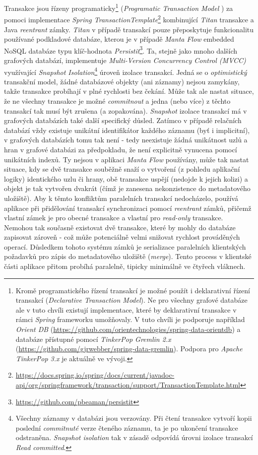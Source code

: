 Transakce jsou řízeny programaticky\footnote{Kromě programatického řízení transakcí je možné použít i deklarativní řízení transakcí (\textit{Declarative Transaction Model}). Ne pro všechny grafové databáze ale v tuto chvíli existují implementace, které by deklarativní transakce v rámci \textit{Spring} frameworku umožňovaly. V tuto chvíli je podporuje například \textit{Orient DB} (\url{https://github.com/orientechnologies/spring-data-orientdb}) a databáze přístupné pomocí \textit{TinkerPop Gremlin 2.x} (\url{https://github.com/gjrwebber/spring-data-gremlin}). Podpora pro \textit{Apache TinkerPop 3.x} je aktuálně ve vývoji.} (\textit{Programatic Transaction Model} \cite{Little04}) za pomoci implementace \textit{Spring TransactionTemplate}\footnote{\url{https://docs.spring.io/spring/docs/current/javadoc-api/org/springframework/transaction/support/TransactionTemplate.html}} kombinující \textit{Titan} transakce a Java \textit{reentrant} zámky.
\textit{Titan} v případě transakcí pouze přeposkytuje funkcionalitu používané podkladové databáze, kterou je v případě \textit{Manta Flow} embedded NoSQL databáze typu klíč-hodnota \textit{Persistit}\footnote{\url{https://github.com/pbeaman/persistit}}. Ta, stejně jako mnoho dalších grafových databází, implementuje \textit{Multi-Version Concurrency Control (MVCC)} \cite{Prakash10} využívající \textit{Snapshot Isolation}\footnote{Všechny záznamy v databázi jsou verzovány. Při čtení transakce vytvoří kopii poslední \textit{commitnuté} verze čteného záznamu, ta je po ukončení transakce odstraněna. \textit{Snapshot isolation} tak v zásadě odpovídá úrovni izolace transakcí \textit{Read committed}.} úroveň izolace transakcí.
Jedná se o \textit{optimistický} transakční model, žádné databázové objekty (ani záznamy) nejsou zamykány, takže transakce probíhají v plné rychlosti bez čekání. Může tak ale nastat situace, že ne všechny transakce je možné \textit{commitnout} a jedna (nebo více) z těchto transakcí tak musí být zrušena (a zopakována). \textit{Snapshot} izolace transakcí má v grafových databázích také další specifický důsled. Zatímco v případě relačních databází vždy existuje unikátní identifikátor každého záznamu (byť i implicitní), v grafových databázích tomu tak není - tedy neexistuje žádná unikátnost uzlů a hran v grafové databázi za předpokladu, že není explicitně vynucena pomocí unikátních indexů. Ty nejsou v aplikaci \textit{Manta Flow} používány, může tak nastat situace, kdy se dvě transakce souběžně snaží o vytvoření (z pohledu aplikační logiky) identického uzlu či hrany, obě transakce uspějí (nedojde k jejich kolizi) a objekt je tak vytvořen dvakrát (čímž je zanesena nekonzistence do metadatového uložiště).
Aby k těmto konfliktům paralelních transakcí nedocházelo, používá aplikace při přidělování transakcí synchronizaci pomocí \textit{reentrant} zámků, přičemž vlastní zámek je pro obecné transakce a vlastní pro \textit{read-only} transakce. Nemohou tak současně existovat dvě transakce, které by mohly do databáze zapisovat zároveň - což může potenciálně velmi snižovat rychlost prováděných operací. Důsledkem tohoto systému zámků je serializace paralelních klientských požadavků pro zápis do metadatového uložiště (\textit{merge}). Tento process v klientské části aplikace přitom probíhá paralelně, tipicky minimálně ve čtyřech vláknech.


